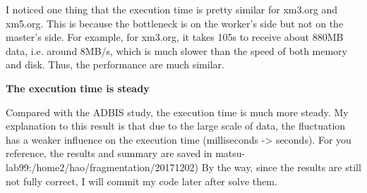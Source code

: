 I noticed one thing that the execution time is pretty similar for
xm3.org and xm5.org. This is because the bottleneck is on the worker's
side but not on the master's side. For example, for xm3.org,
it takes 105s to receive about 880MB data, i.e. around 8MB/s, which
is much slower than the speed of both memory and disk. Thus,
the performance are much similar.

\textbf{The execution time is steady}

Compared with the ADBIS study, the execution time is much more
steady. My explanation to this result is that due to the large scale
of data, the fluctuation has a weaker influence on the execution
time (milliseconds -> seconds). For you reference, the results and
summary are saved in matsu-lab99:/home2/hao/fragmentation/20171202)
By the way, since the results are still not fully correct, I will
commit my code later after solve them.

 